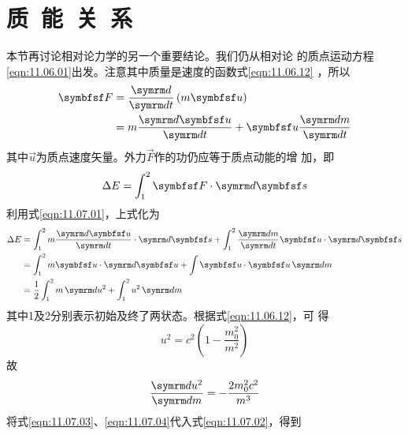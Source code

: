 \section[质能关系]{质~能~关~系}\label{sec:11.07}

本节再讨论相对论力学的另一个重要结论。我们仍从相对论
的质点运动方程\eqref{eqn:11.06.01}出发。注意其中质量是速度的函数式\lhbrak \eqref{eqn:11.06.12} \rhbrak ，所以
\begin{equation}\label{eqn:11.07.01}
    \begin{split}
        \vec{F} &= \frac {  \dif } {  \dif t } \left( m \vec{u} \right) \\
          &= m \frac {  \dif \vec{u} } {  \dif t } + \vec{u} \frac {  \dif m } {  \dif t }
    \end{split}
\end{equation}
其中$ \vec{u} $为质点速度矢量。外力$\vec{F}$作的功仍应等于质点动能的增
加，即
\begin{equation*}
    \Delta E = \int _ 1 ^ 2 \vec{F} \cdot  \dif \vec{s}
\end{equation*}
利用式\eqref{eqn:11.07.01}，上式化为
\begin{equation}\label{eqn:11.07.02}
    \begin{aligned}
        \Delta E &=\int_{1}^{2} m \frac{ \dif \vec{u}}{ \dif t} \cdot  \dif \vec{s}+\int_{1}^{2} \frac{ \dif m}{ \dif t} \vec{u } \cdot  \dif \vec{s} \\
        &=\int_{1}^{2} m \vec{u} \cdot  \dif \vec{u}+\int \vec{u} \cdot \vec{u}  \dif m \\
        &=\frac{1}{2} \int_{1}^{2} m  \dif u^{2}+\int_{1}^{2} u^{2}  \dif m
    \end{aligned}
\end{equation}
其中1及2分别表示初始及终了两状态。根据式\eqref{eqn:11.06.12}，可
得
\begin{equation}\label{eqn:11.07.03}
    u ^ { 2 } = c ^ { 2 } \left( 1 - \frac { m _ { 0 } ^ { 2 } } { m ^ { 2 } } \right)
\end{equation}
故
\begin{equation}\label{eqn:11.07.04}
    \frac{ \dif u^{2}}{ \dif m}=-\frac{2 m_{0}^{2} c^{2}}{m^{3}}
\end{equation}
将式\eqref{eqn:11.07.03}、\eqref{eqn:11.07.04}代入式\eqref{eqn:11.07.02}，得到

